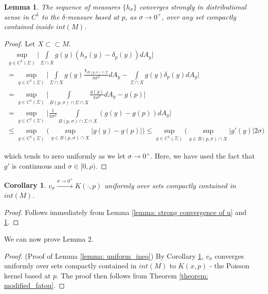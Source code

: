 \documentclass{amsart}
\newtheorem{corr}{Corollary}
\newtheorem{lemma}{Lemma}
\theoremstyle{named}
\begin{document}
\begin{lemma} \label{lemma: distributional conv h_sigma}
    The sequence of measures $\{ h_{\sigma} \}$ converges strongly in distributional sense in $C^1$ to the $\delta$-measure based at $p$, as $\sigma \rightarrow 0^{+}$, over any set compactly contained inside $int(M)$.
\end{lemma}

\begin{proof}
    Let $X \subset\subset M$.
    \begin{gather*} 
        \sup\limits_{g \in C^1(\Sigma)} \bigg| \int\limits_{\Sigma \cap X} g(y) (h_{\sigma}(y) - \delta_{p}(y)) dA_y \bigg| \\ 
        = \sup\limits_{g \in C^1(\Sigma)} \bigg| \int\limits_{\Sigma \cap X} g(y) \frac{\chi_{B(p,\sigma) \cap \Sigma}}{\pi \sigma^2} dA_y - \int\limits_{\Sigma \cap X} g(y) \delta_p(y) dA_y \bigg| \\ 
        = \sup\limits_{g \in C^1(\Sigma)} \bigg| \int\limits_{B(p,\sigma) \cap \Sigma \cap X} \frac{g(y)}{\pi \sigma^2} dA_y - g(p) \bigg| \\ 
        = \sup\limits_{g \in C^1(\Sigma)} \bigg| \frac{1}{\pi \sigma^2} \int\limits_{B(p,\sigma) \cap \Sigma \cap X} (g(y) - g(p)) dA_y \bigg| \\ 
        \leq \sup\limits_{g \in C^1(\Sigma)} \bigg( \sup\limits_{y \in B(p,\sigma) \cap X} \Big| g(y) - g(p) \Big| \bigg)
        \leq \sup\limits_{g \in C^1(\Sigma)} \bigg( \sup\limits_{y \in \overline{B(p,\sigma) \cap X}} |g'(y)| 2\sigma \bigg)
    \end{gather*}

    which tends to zero uniformly as we let $\sigma \rightarrow 0^{+}$. Here, we have used the fact that $g'$ is continuous and $\sigma \in [0,\rho)$.
    
\end{proof}

\begin{corr} \label{corollary: corr1}
    $v_{\sigma} \xrightarrow{\sigma \rightarrow 0^{+}} K(\cdot ,p)$ uniformly over sets compactly contained in $int(M)$.
\end{corr}

\begin{proof}
    Follows immediately from Lemma \ref{lemma: strong convergence of u} and \ref{lemma: distributional conv h_sigma}.
\end{proof}

We can now prove Lemma 2.

\begin{proof} (Proof of Lemma \ref{lemma: uniform_ineq})
    By Corollary \ref{corollary: corr1}, $v_{\sigma}$ converges uniformly over sets compactly contained in $int(M)$ to $K(x,p)$ - the Poisson kernel based at $p$. The proof then follows from Theorem \ref{theorem: modified_fatou}.
\end{proof}
\end{document}
